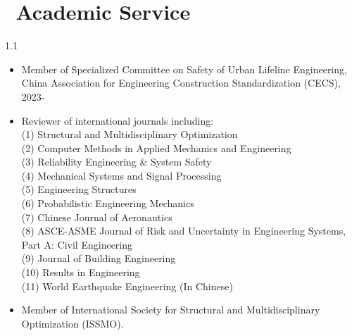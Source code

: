\documentclass{resume}
\begin{document}
\vspace{-18pt}
\section{\faInfo\;\;\, Academic Service}
\begin{spacing}{1.1}
\begin{itemize} [itemsep=2pt,topsep=2pt]
  \item Member of Specialized Committee on Safety of Urban Lifeline Engineering, China Association for Engineering Construction Standardization (CECS), 2023-
  \item Reviewer of international journals including: \\
  (1) Structural and Multidisciplinary Optimization\\
  (2) Computer Methods in Applied Mechanics and Engineering\\
  (3) Reliability Engineering \& System Safety\\
  (4) Mechanical Systems and Signal Processing\\
  (5) Engineering Structures\\
  (6) Probabilistic Engineering Mechanics\\
  (7) Chinese Journal of Aeronautics\\
  (8) ASCE-ASME Journal of Risk and Uncertainty in Engineering Systems, Part A: Civil Engineering\\
  (9) Journal of Building Engineering\\
  (10) Results in Engineering\\
  (11) World Earthquake Engineering (In Chinese)
  
  \item Member of International Society for Structural and Multidisciplinary Optimization (ISSMO).
\end{itemize}
 \end{spacing}
\end{document}
